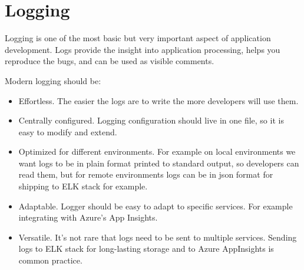     \section{Logging}\label{sec:logging}

    Logging is one of the most basic but very important aspect of application development.
    Logs provide the insight into application processing, helps you reproduce the bugs, and can be used as visible comments.

    Modern logging should be:
    \begin{itemize}
        \item Effortless.
        The easier the logs are to write the more developers will use them.
        \item Centrally configured.
        Logging configuration should live in one file, so it is easy to modify and extend.
        \item Optimized for different environments.
        For example on local environments we want logs to be in plain format printed to standard output,
        so developers can read them, but for remote environments logs can be in json format for shipping
        to ELK stack for example.
        \item Adaptable.
        Logger should be easy to adapt to specific services.
        For example integrating with Azure's App Insights.
        \item Versatile.
        It's not rare that logs need to be sent to multiple services.
        Sending logs to ELK stack for long-lasting storage and to Azure AppInsights is common practice.
    \end{itemize}

